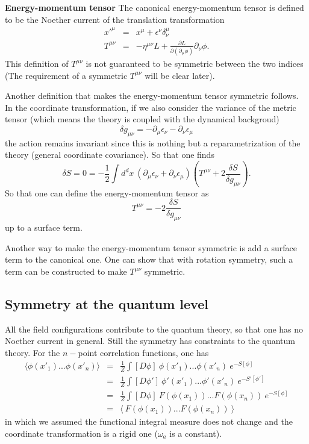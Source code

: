 \documentclass[submission, PhysLectNotes]{SciPost}
\begin{document}
{\bf Energy-momentum tensor}
The canonical energy-momentum tensor is defined to be the Noether current of the translation transformation
\begin{eqnarray}
    x'^\mu &=& x^\mu + \epsilon^\nu \delta^\mu_\nu \\
    T^{\mu\nu} &=& -\eta^{\mu\nu} L + \frac{\partial L}{\partial(\partial_\mu \phi)}\partial_\nu \phi.
\end{eqnarray}
This definition of $T^{\mu\nu}$ is not guaranteed to be symmetric between the two indices (The requirement of a symmetric $T^{\mu\nu}$ will be clear later).

Another definition that makes the energy-momentum tensor symmetric follows. In the coordinate transformation, if we also consider the variance of the metric tensor (which means the theory is coupled with the dynamical backgroud)
\begin{equation}
\delta g_{\mu\nu} = -\partial_\mu\epsilon_\nu -\partial_\nu\epsilon_\mu
\end{equation}
the action remains invariant since this is nothing but a reparametrization of the theory (general coordinate covariance). So that one finds
\begin{equation}
    \delta S = 0 = -\frac{1}{2} \int d^d x \ \left(\partial_\mu\epsilon_\nu + \partial_\nu\epsilon_\mu\right) \left(T^{\mu\nu} +2\frac{\delta S}{\delta g_{\mu\nu}}\right).
\end{equation}
So that one can define the energy-momentum tensor as
\begin{equation}
    T^{\mu\nu} = -2\frac{\delta S}{\delta g_{\mu\nu}}
\end{equation}
up to a surface term.

Another way to make the energy-momentum tensor symmetric is add a surface term to the canonical one. One can show that with rotation symmetry, such a term can be constructed to make $T^{\mu\nu}$ symmetric.

\subsection{Symmetry at the quantum level}
All the field configurations contribute to the quantum theory, so that one has no Noether current in general. Still the symmetry has constraints to the quantum theory. For the $n-$point correlation functions, one has
\begin{eqnarray}
\langle \phi(x'_1)...\phi(x'_n) \rangle &=& \frac{1}{Z}\int [D\phi]\ \phi(x'_1)...\phi(x'_n) \ e^{-S[\phi]} \\
&=& \frac{1}{Z}\int [D\phi']\ \phi'(x'_1)...\phi'(x'_n) \ e^{-S'[\phi']} \\
&=& \frac{1}{Z}\int [D\phi]\ F(\phi(x_1))...F(\phi(x_n)) \ e^{-S[\phi]} \\
&=& \langle\ F(\phi(x_1))...F(\phi(x_n)) \ \rangle
\end{eqnarray}
in which we assumed the functional integral measure does not change and the coordinate transformation is a rigid one ($\omega_a$ is a constant).
\end{document}
